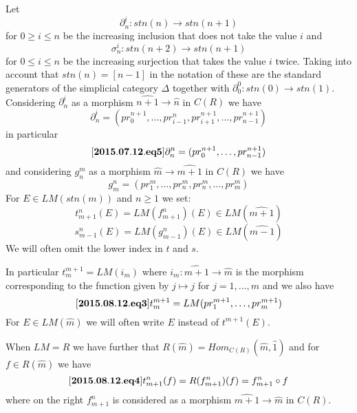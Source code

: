 \documentclass[11pt]{article}
\newenvironment{eq}{\begin{equation}}{\end{equation}}
\newcommand{\llabel}[1]{\label{#1}[{\bf #1}]}
\newcommand{\sr}{\rightarrow}
\newcommand{\wh}{\widehat}
\begin{document}
Let 
%
$$\partial^{i}_{n}:stn(n)\sr stn(n+1)$$
%
for $0\ge i\le n$ be the increasing inclusion that does not take the value $i$ and
%
$$\sigma^{i}_{n}:stn(n+2)\sr stn(n+1)$$
%
for $0\le i\le n$ be the increasing surjection that takes the value $i$ twice. Taking into account that $stn(n)=[n-1]$ in the notation of \cite{GabZis} these are the standard generators of the simplicial category $\Delta$ together with $\partial^0_0:stn(0)\sr stn(1)$. 
%
Considering $\partial^i_n$  as a morphism $\wh{n+1}\sr \wh{n}$ in $C(R)$ we have
%
$$\partial^i_n=(pr^{n+1}_0,\dots,pr^{n}_{i-1},pr^{n+1}_{i+1},\dots,pr^{n+1}_{n-1})$$
%
in particular
%
\begin{eq}\llabel{2015.07.12.eq5}
\partial^{n}_n=(pr^{n+1}_0,\dots,pr^{n+1}_{n-1})
\end{eq}
%
and considering $g_n^m$ as a morphism $\wh{m}\sr \wh{m+1}$ in $C(R)$ we have
%
$$g^n_m=(pr^m_1,\dots,pr^m_n,pr^m_n,\dots,pr^m_{m})$$
%
For $E\in LM({stn(m)})$ and $n\ge 1$ we set:
%
$$t^n_{m+1}(E)=LM(f^n_{m+1})(E)\in LM(\wh{m+1})$$
$$s^n_{m-1}(E)=LM(g^n_{m-1})(E)\in LM(\wh{m-1})$$
%
We will often omit the lower index in $t$ and $s$. 

In particular $t^{m+1}_m=LM(i_m)$ where $i_m:\wh{m+1}\sr \wh{m}$ is the morphism corresponding to the function given by $j\mapsto j$ for $j=1,\dots,m$ and we also have
%
\begin{eq}\llabel{2015.08.12.eq3}
t_m^{m+1}=LM(pr^{m+1}_1,\dots,pr^{m+1}_m)
\end{eq}
%
For $E\in LM(\wh{m})$ we will often write $E$ instead of $t^{m+1}(E)$.

When $LM=R$ we have further that $R(\wh{m})=Hom_{C(R)}(\wh{m},\wh{1})$ and for $f\in R(\wh{m})$ we have
%
\begin{eq}\llabel{2015.08.12.eq4}
t_{m+1}^n(f)=R(f^n_{m+1})(f)=f^n_{m+1}\circ f
\end{eq}
%
where on the right $f^n_{m+1}$ is considered as a morphism $\wh{m+1}\sr \wh{m}$ in $C(R)$. 
\end{document}
